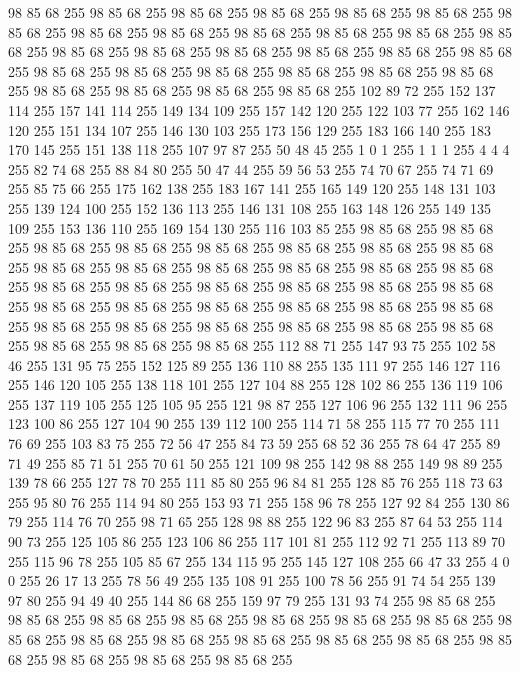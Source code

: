 98 85 68 255 98 85 68 255 98 85 68 255 98 85 68 255 98 85 68 255 98 85 68 255 98 85 68 255 98 85 68 255 98 85 68 255 98 85 68 255 98 85 68 255 98 85 68 255 98 85 68 255 98 85 68 255 98 85 68 255 98 85 68 255 98 85 68 255 98 85 68 255 98 85 68 255 98 85 68 255 98 85 68 255 98 85 68 255 98 85 68 255 98 85 68 255 98 85 68 255 98 85 68 255 98 85 68 255 98 85 68 255 98 85 68 255 102 89 72 255 152 137 114 255 157 141 114 255 149 134 109 255 157 142 120 255 122 103 77 255 162 146 120 255 151 134 107 255 146 130 103 255 173 156 129 255 183 166 140 255 183 170 145 255 151 138 118 255 107 97 87 255 50 48 45 255 1 0 1 255 1 1 1 255 4 4 4 255 82 74 68 255 88 84 80 255 50 47 44 255 59 56 53 255 74 70 67 255 74 71 69 255 85 75 66 255 175 162 138 255 183 167 141 255 165 149 120 255 148 131 103 255 139 124 100 255 152 136 113 255 146 131 108 255 163 148 126 255 149 135 109 255 153 136 110 255
169 154 130 255 116 103 85 255 98 85 68 255 98 85 68 255 98 85 68 255 98 85 68 255 98 85 68 255 98 85 68 255 98 85 68 255 98 85 68 255 98 85 68 255 98 85 68 255 98 85 68 255 98 85 68 255 98 85 68 255 98 85 68 255 98 85 68 255 98 85 68 255 98 85 68 255 98 85 68 255 98 85 68 255 98 85 68 255 98 85 68 255 98 85 68 255 98 85 68 255 98 85 68 255 98 85 68 255 98 85 68 255 98 85 68 255 98 85 68 255 98 85 68 255 98 85 68 255 98 85 68 255 98 85 68 255 98 85 68 255 98 85 68 255 98 85 68 255 112 88 71 255 147 93 75 255 102 58 46 255 131 95 75 255 152 125 89 255 136 110 88 255 135 111 97 255 146 127 116 255 146 120 105 255 138 118 101 255 127 104 88 255 128 102 86 255 136 119 106 255 137 119 105 255 125 105 95 255 121 98 87 255 127 106 96 255 132 111 96 255 123 100 86 255 127 104 90 255 139 112 100 255 114 71 58 255 115 77 70 255 111 76 69 255 103 83 75 255 72 56 47 255 84 73 59 255
68 52 36 255 78 64 47 255 89 71 49 255 85 71 51 255 70 61 50 255 121 109 98 255 142 98 88 255 149 98 89 255 139 78 66 255 127 78 70 255 111 85 80 255 96 84 81 255 128 85 76 255 118 73 63 255 95 80 76 255 114 94 80 255 153 93 71 255 158 96 78 255 127 92 84 255 130 86 79 255 114 76 70 255 98 71 65 255 128 98 88 255 122 96 83 255 87 64 53 255 114 90 73 255 125 105 86 255 123 106 86 255 117 101 81 255 112 92 71 255 113 89 70 255 115 96 78 255 105 85 67 255 134 115 95 255 145 127 108 255 66 47 33 255 4 0 0 255 26 17 13 255 78 56 49 255 135 108 91 255 100 78 56 255 91 74 54 255 139 97 80 255 94 49 40 255 144 86 68 255 159 97 79 255 131 93 74 255 98 85 68 255 98 85 68 255 98 85 68 255 98 85 68 255 98 85 68 255 98 85 68 255 98 85 68 255 98 85 68 255 98 85 68 255 98 85 68 255 98 85 68 255 98 85 68 255 98 85 68 255 98 85 68 255 98 85 68 255 98 85 68 255 98 85 68 255
